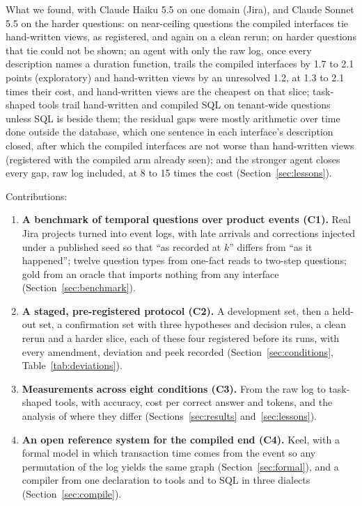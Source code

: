 \documentclass[sigconf, nonacm]{acmart}
\begin{document}
What we found, with Claude Haiku 5.5 on one domain (Jira), and Claude Sonnet 5.5 on the harder questions: on near-ceiling questions the compiled interfaces tie hand-written views, as registered, and again on a clean rerun; on harder questions that tie could not be shown; an agent with only the raw log, once every description names a duration function, trails the compiled interfaces by 1.7 to 2.1 points (exploratory) and hand-written views by an unresolved 1.2, at 1.3 to 2.1 times their cost, and hand-written views are the cheapest on that slice; task-shaped tools trail hand-written and compiled SQL on tenant-wide questions unless SQL is beside them; the residual gaps were mostly arithmetic over time done outside the database, which one sentence in each interface's description closed, after which the compiled interfaces are not worse than hand-written views (registered with the compiled arm already seen); and the stronger agent closes every gap, raw log included, at 8 to 15 times the cost (Section~\ref{sec:lessons}).

Contributions:

\begin{enumerate}[leftmargin=*]
\item \textbf{A benchmark of temporal questions over product events (C1).} Real Jira projects turned into event logs, with late arrivals and corrections injected under a published seed so that ``as recorded at $k$'' differs from ``as it happened''; twelve question types from one-fact reads to two-step questions; gold from an oracle that imports nothing from any interface (Section~\ref{sec:benchmark}).
\item \textbf{A staged, pre-registered protocol (C2).} A development set, then a held-out set, a confirmation set with three hypotheses and decision rules, a clean rerun and a harder slice, each of these four registered before its runs, with every amendment, deviation and peek recorded (Section~\ref{sec:conditions}, Table~\ref{tab:deviations}).
\item \textbf{Measurements across eight conditions (C3).} From the raw log to task-shaped tools, with accuracy, cost per correct answer and tokens, and the analysis of where they differ (Sections~\ref{sec:results} and~\ref{sec:lessons}).
\item \textbf{An open reference system for the compiled end (C4).} Keel, with a formal model in which transaction time comes from the event so any permutation of the log yields the same graph (Section~\ref{sec:formal}), and a compiler from one declaration to tools and to SQL in three dialects (Section~\ref{sec:compile}).
\end{enumerate}
\end{document}
